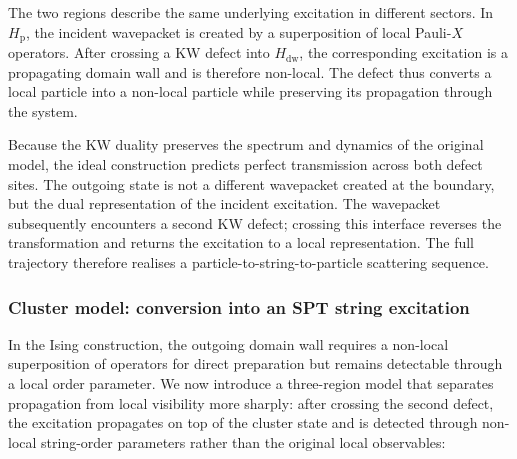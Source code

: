 \documentclass[aps,floatfix,10pt,amssymb,amsfont,amsmath,superscriptaddress,float,nofootinbib,longbibliography,nobalancelastpage,twocolumn]{revtex4-2}
\begin{document}
The two regions describe the same underlying excitation in different sectors. In $H_\mathrm{p}$, the incident wavepacket is created by a superposition of local Pauli-$X$ operators. After crossing a KW defect into $H_\mathrm{dw}$, the corresponding excitation is a propagating domain wall and is therefore non-local. The defect thus converts a local particle into a non-local particle while preserving its propagation through the system.

Because the KW duality preserves the spectrum and dynamics of the original model, the ideal construction predicts perfect transmission across both defect sites. The outgoing state is not a different wavepacket created at the boundary, but the dual representation of the incident excitation. The wavepacket subsequently encounters a second KW defect; crossing this interface reverses the transformation and returns the excitation to a local representation. The full trajectory therefore realises a particle-to-string-to-particle scattering sequence.

\subsubsection{Cluster model: conversion into an SPT string excitation}
In the Ising construction, the outgoing domain wall requires a non-local superposition of operators for direct preparation but remains detectable through a local order parameter. We now introduce a three-region model that separates propagation from local visibility more sharply: after crossing the second defect, the excitation propagates on top of the cluster state and is detected through non-local string-order parameters rather than the original local observables:
\end{document}
